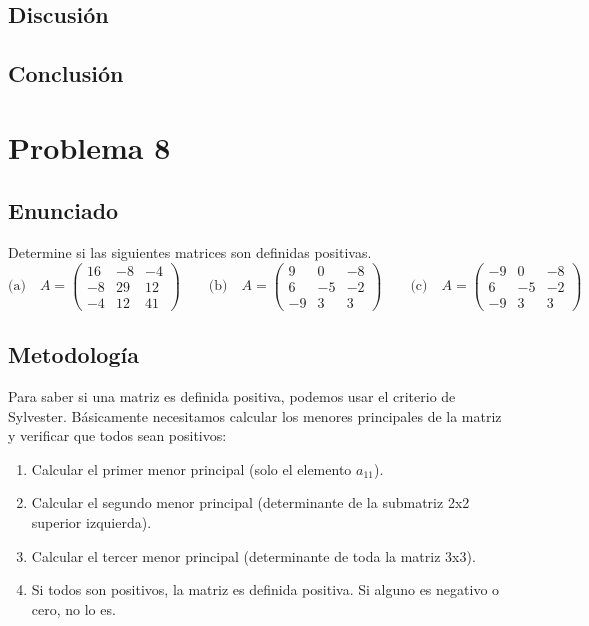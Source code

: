 \documentclass{article}
\begin{document}
\subsection{Discusión}

\subsection{Conclusión}

\section{Problema 8}

\subsection{Enunciado}
Determine si las siguientes matrices son definidas positivas.
\[
\text{(a)}\quad
A=\begin{pmatrix}
16 & -8 & -4\\
-8 & 29 & 12\\
-4 & 12 & 41
\end{pmatrix}
\qquad
\text{(b)}\quad
A=\begin{pmatrix}
9 & 0 & -8\\
6 & -5 & -2\\
-9 & 3 & 3
\end{pmatrix}
\qquad
\text{(c)}\quad
A=\begin{pmatrix}
-9 & 0 & -8\\
6 & -5 & -2\\
-9 & 3 & 3
\end{pmatrix}
\]

\subsection{Metodología}

Para saber si una matriz es definida positiva, podemos usar el criterio de Sylvester. Básicamente necesitamos calcular los menores principales de la matriz y verificar que todos sean positivos:
\begin{enumerate}
    \item Calcular el primer menor principal (solo el elemento $a_{11}$).
    \item Calcular el segundo menor principal (determinante de la submatriz 2x2 superior izquierda).
    \item Calcular el tercer menor principal (determinante de toda la matriz 3x3).
    \item Si todos son positivos, la matriz es definida positiva. Si alguno es negativo o cero, no lo es.
\end{enumerate}
\end{document}
